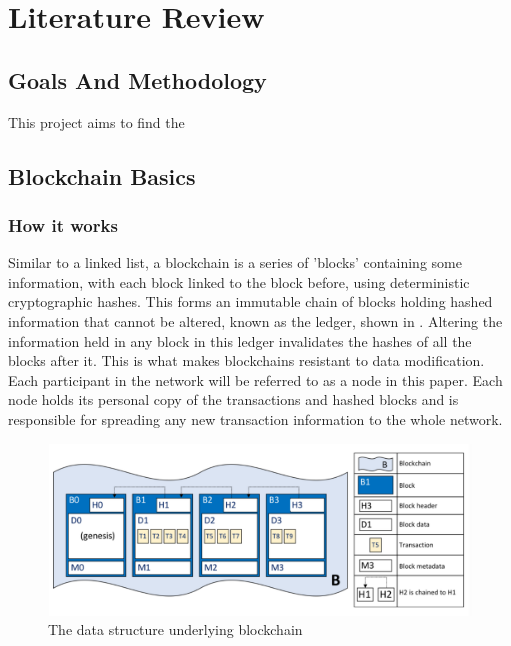 \chapter{Literature Review}

\section{Goals And Methodology}
This project aims to find the


\section{Blockchain Basics}


\subsection{How it works}

Similar to a linked list, a blockchain is a series of 'blocks' containing some information, with each block linked to the block before, using deterministic cryptographic hashes. This forms an immutable chain of blocks holding hashed information that cannot be altered, known as the ledger, shown in . Altering the information held in any block in this ledger invalidates the hashes of all the blocks after it. This is what makes blockchains resistant to data modification. Each participant in the network will be referred to as a node in this paper. Each node holds its personal copy of the transactions and hashed blocks and is responsible for spreading any new transaction information to the whole network.

\begin{figure}[h]
    \centering
    \includegraphics[width=13cm,center]{Figures/BlockchainStructure.png}
    \caption{The data structure underlying blockchain \cite{ADocumentation}}
    \label{Figure:BasicBlockchain}
\end{figure}


